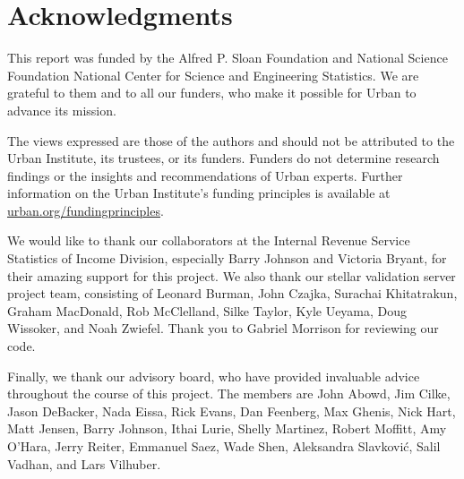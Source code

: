 \fancyfoot{}


\part{Acknowledgments}

This report was funded by the Alfred P. Sloan Foundation and National Science Foundation National Center for Science and Engineering Statistics. We are grateful to them and to all our funders, who make it possible for Urban to advance its mission. 

The views expressed are those of the authors and should not be attributed to the Urban Institute, its trustees, or its funders. Funders do not determine research findings or the insights and recommendations of Urban experts. Further information on the Urban Institute’s funding principles is available at \href{https://www.urban.org/aboutus/our-funding/funding-principles}{urban.org/fundingprinciples}.

We would like to thank our collaborators at the Internal Revenue Service Statistics of Income Division, especially Barry Johnson and Victoria Bryant, for their amazing support for this project. We also thank our stellar validation server project team, consisting of Leonard Burman, John Czajka, Surachai Khitatrakun, Graham MacDonald, Rob McClelland, Silke Taylor, Kyle Ueyama, Doug Wissoker, and Noah Zwiefel. Thank you to Gabriel Morrison for reviewing our code.

Finally, we thank our advisory board, who have provided invaluable advice throughout the course of this project. The members are John Abowd, Jim Cilke, Jason DeBacker, Nada Eissa, Rick Evans, Dan Feenberg, Max Ghenis, Nick Hart, Matt Jensen, Barry Johnson, Ithai Lurie,  Shelly Martinez, Robert Moffitt, Amy O'Hara, Jerry Reiter, Emmanuel Saez, Wade Shen, Aleksandra Slavkovi\'c, Salil Vadhan, and Lars Vilhuber.